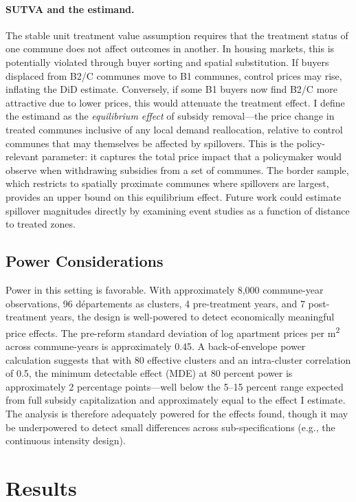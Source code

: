 \documentclass[12pt]{article}
\begin{document}
\paragraph{SUTVA and the estimand.} The stable unit treatment value assumption requires that the treatment status of one commune does not affect outcomes in another. In housing markets, this is potentially violated through buyer sorting and spatial substitution. If buyers displaced from B2/C communes move to B1 communes, control prices may rise, inflating the DiD estimate. Conversely, if some B1 buyers now find B2/C more attractive due to lower prices, this would attenuate the treatment effect. I define the estimand as the \textit{equilibrium effect} of subsidy removal---the price change in treated communes inclusive of any local demand reallocation, relative to control communes that may themselves be affected by spillovers. This is the policy-relevant parameter: it captures the total price impact that a policymaker would observe when withdrawing subsidies from a set of communes. The border sample, which restricts to spatially proximate communes where spillovers are largest, provides an upper bound on this equilibrium effect. Future work could estimate spillover magnitudes directly by examining event studies as a function of distance to treated zones.

\subsection{Power Considerations}

Power in this setting is favorable. With approximately 8,000 commune-year observations, 96 départements as clusters, 4 pre-treatment years, and 7 post-treatment years, the design is well-powered to detect economically meaningful price effects. The pre-reform standard deviation of log apartment prices per m\textsuperscript{2} across commune-years is approximately 0.45. A back-of-envelope power calculation suggests that with 80 effective clusters and an intra-cluster correlation of 0.5, the minimum detectable effect (MDE) at 80 percent power is approximately 2 percentage points---well below the 5--15 percent range expected from full subsidy capitalization and approximately equal to the effect I estimate. The analysis is therefore adequately powered for the effects found, though it may be underpowered to detect small differences across sub-specifications (e.g., the continuous intensity design).


\section{Results}
\end{document}
